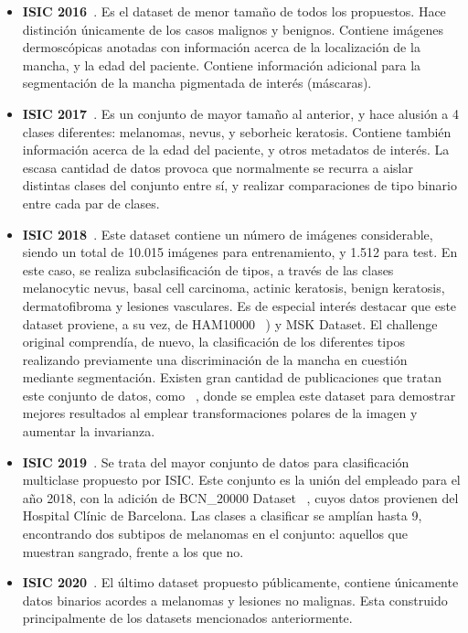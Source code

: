 \begin{itemize}
	
	\item \textbf{ISIC 2016}~\cite{gutman2016skin}. Es el dataset de menor tamaño de todos los propuestos. Hace distinción únicamente de los casos malignos y benignos. Contiene imágenes dermoscópicas anotadas con información acerca de la localización de la mancha, y la edad del paciente. Contiene información adicional para la segmentación de la mancha pigmentada de interés (máscaras).
	\item \textbf{ ISIC 2017}~\cite{codella2018skin}. Es un conjunto de mayor tamaño al anterior, y hace alusión a 4 clases diferentes: melanomas, nevus, y seborheic keratosis. Contiene también información acerca de la edad del paciente, y otros metadatos de interés. La escasa cantidad de datos provoca que normalmente se recurra a aislar distintas clases del conjunto entre sí, y realizar comparaciones de tipo binario entre cada par de clases.
	\item\textbf{ISIC 2018}~\cite{ham10000,codella2018skin,combalia2019bcn20000}. Este dataset contiene un número de imágenes considerable, siendo un total de 10.015 imágenes para entrenamiento, y 1.512 para test. En este caso, se realiza subclasificación de tipos, a través de las clases melanocytic nevus, basal cell carcinoma, actinic keratosis, benign keratosis, dermatofibroma y lesiones vasculares. Es de especial interés destacar que este dataset proviene, a su vez, de HAM10000~\cite{ham10000} )  y MSK Dataset. El challenge original comprendía, de nuevo, la clasificación de los diferentes tipos realizando previamente una discriminación de la mancha en cuestión mediante segmentación. Existen gran cantidad de publicaciones que tratan este conjunto de datos, como ~\cite{benvcevic2021training}, donde se emplea este dataset para demostrar mejores resultados al emplear transformaciones polares de la imagen y aumentar la invarianza.
	
	\item \textbf{ISIC 2019}~\cite{ham10000,codella2018skin,combalia2019bcn20000}.  Se trata del mayor conjunto de datos para clasificación multiclase propuesto por ISIC. Este conjunto es la unión del empleado para el año 2018, con la adición de BCN\_20000 Dataset ~\cite{combalia2019bcn20000}, cuyos datos provienen del Hospital Clínic de Barcelona. Las clases a clasificar se amplían hasta 9, encontrando dos subtipos de melanomas en el conjunto: aquellos que muestran sangrado, frente a los que no.
	\item \textbf{ISIC 2020}~\cite{Rotemberg_2021}. El último dataset propuesto públicamente, contiene únicamente datos binarios acordes a melanomas y lesiones no malignas. Esta construido principalmente de los datasets mencionados anteriormente.
\end{itemize}

